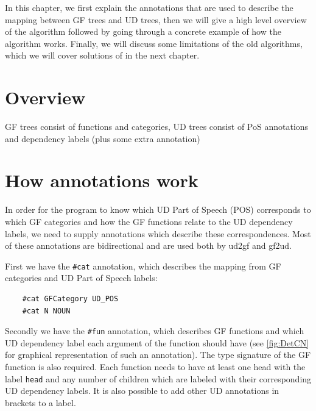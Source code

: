 





In this chapter, we first explain the annotations that are used to describe the mapping between GF trees and UD trees, then we will give a high level overview of the algorithm followed by going through a concrete example of how the algorithm works. Finally, we will discuss some limitations of the old algorithms, which we will cover solutions of in the next chapter.

\section{Overview}


GF trees consist of functions and categories, UD trees consist of PoS annotations and dependency labels (plus some extra annotation)

\section{How annotations work}

In order for the program to know which UD Part of Speech (POS) corresponds to which GF categories and how the GF functions relate to the UD dependency labels, we need to supply annotations which describe these correspondences. Most of these annotations are bidirectional and are used both by ud2gf and gf2ud.

First we have the \lstinline{#cat} annotation, which describes the mapping from GF categories and UD Part of Speech labels:

\begin{lstlisting}
    #cat GFCategory UD_POS
    #cat N NOUN
\end{lstlisting}

Secondly we have the \lstinline{#fun} annotation, which describes GF functions and which UD dependency label each argument of the function should have (see \autoref{fig:DetCN} for graphical representation of such an annotation). The type signature of the GF function is also required. Each function needs to have at least one head with the label \lstinline{head} and any number of children which are labeled with their corresponding UD dependency labels. It is also possible to add other UD annotations in brackets to a label.

